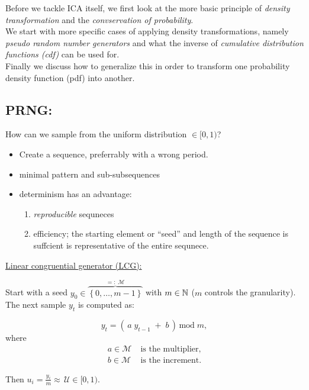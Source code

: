 Before we tackle ICA itself, we first look at the more basic principle of \emph{density transformation} and 
the \emph{convservation of probability}.\\
We start with more specific cases of applying density transformations, 
namely \emph{pseudo random number generators} and what the inverse of \emph{cumulative distribution functions (cdf)} can be used for.\\
Finally we discuss how to generalize this in order to transform one probability density function (pdf) into another.

\subsection{PRNG:}

How can we sample from the uniform distribution $\in \lbrack0, 1)$?

\begin{itemize}
\item Create a sequence, preferrably with a wrong period.
\item minimal pattern and sub-subsequences
\item determinism has an advantage:
\begin{enumerate}
	\item \emph{reproducible} sequneces
	\item efficiency; the starting element or ``seed'' and length of the sequence is suffcient is representative of the entire sequnece.
\end{enumerate}
\end{itemize}

\underline{Linear congruential generator (LCG):}

Start with a seed $y_0 \in \overbrace{\left\{0,\ldots,m-1\right\}}^{=:\;\mathcal{M}}$ with $m \in \mathbb{N}$ ($m$ controls the granularity). 
The next sample $y_t$ is computed as:

\begin{equation}
y_t = \left( \, a \; y_{t-1} \; + \; b \, \right) \, \text{mod} \; m,
\end{equation}
where\\[-0.7cm]
\begin{align*}
a \in \mathcal{M}&\; \text{is the multiplier,} \\
b \in \mathcal{M}&\; \text{is the increment.}
\end{align*}

Then $u_i = \frac{y_i}{m} \approx \,\mathcal{U} \in \lbrack0, 1)$.

